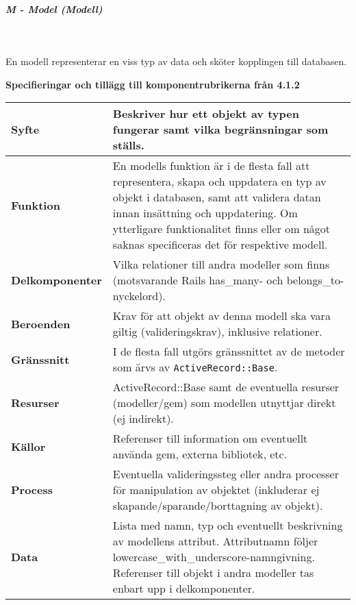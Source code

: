 \documentclass[a4paper, twoside, 11pt, titlepage]{article}
\begin{document}
			\subparagraph{\emph{M - Model (\emph{Modell})}}\

				En modell representerar en viss typ av data och sköter kopplingen till databasen.

				\textbf{Specifieringar och tillägg till komponentrubrikerna från 4.1.2}

				\begin {table} [ht] \begin{tabular} { p{2.6cm} p{12.5cm} }
					\hline
					{\sffamily\textbf{Syfte}} & {Beskriver hur ett objekt av typen fungerar samt vilka begränsningar som ställs.} \\
					\hline
					{\sffamily\textbf{Funktion}} & {En modells funktion är i de flesta fall att representera, skapa och uppdatera en typ av objekt i databasen, samt att validera datan innan insättning och uppdatering. Om ytterligare funktionalitet finns eller om något saknas specificeras det för respektive modell.} \\
					\hline
					{\sffamily\textbf{Delkomponenter}} & {Vilka relationer till andra modeller som finns (motsvarande Rails has\_many- och belongs\_to-nyckelord).} \\
					\hline
					{\sffamily\textbf{Beroenden}} & {Krav för att objekt av denna modell ska vara giltig (valideringskrav), inklusive relationer.} \\
					\hline
					{\sffamily\textbf{Gränssnitt}} & {I de flesta fall utgörs gränssnittet av de metoder som ärvs av {\tt ActiveRecord::Base}.} \\
					\hline
					{\sffamily\textbf{Resurser}} & {ActiveRecord::Base samt de eventuella resurser (modeller/gem) som modellen utnyttjar direkt (ej indirekt).} \\
					\hline
					{\sffamily\textbf{Källor}} & {Referenser till information om eventuellt använda gem, externa bibliotek, etc.} \\
					\hline
					{\sffamily\textbf{Process}} & {Eventuella valideringssteg eller andra processer för manipulation av objektet (inkluderar ej skapande/sparande/borttagning av objekt).} \\
					\hline
					{\sffamily\textbf{Data}} & {Lista med namn, typ och eventuellt beskrivning av modellens attribut. Attributnamn följer lowercase\_with\_underscore-namngivning. Referenser till objekt i andra modeller tas enbart upp i delkomponenter.} \\
					\hline
				\end{tabular} \end{table} \FloatBarrier
\end{document}
